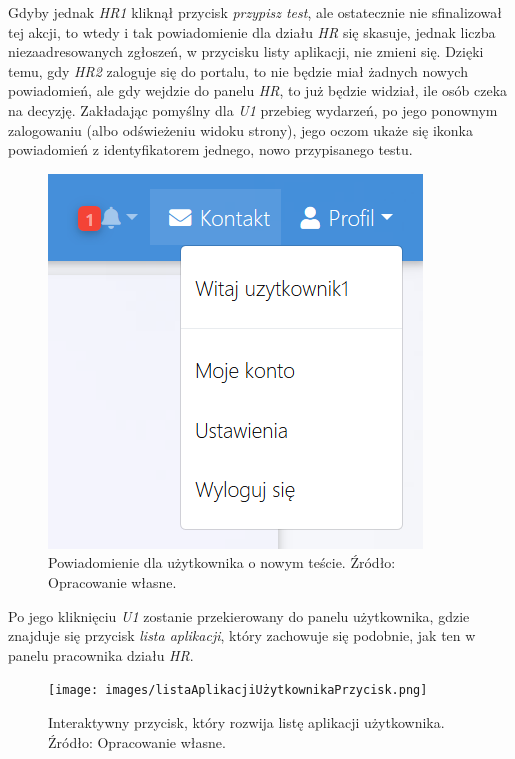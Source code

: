 \documentclass[twoside]{projektInzynierskiMS}
\numberwithin{figure}{section}
\begin{document}
Gdyby jednak \textit{HR1} kliknął przycisk \textit{przypisz test}, ale ostatecznie nie sfinalizował tej akcji, to wtedy i tak powiadomienie dla działu \textit{HR} się skasuje, jednak liczba niezaadresowanych zgłoszeń, w przycisku listy aplikacji, nie zmieni się. Dzięki temu, gdy \textit{HR2} zaloguje się do portalu, to nie będzie miał żadnych nowych powiadomień, ale gdy wejdzie do panelu \textit{HR}, to już będzie widział, ile osób czeka na decyzję. Zakładając pomyślny dla \textit{U1} przebieg wydarzeń, po jego ponownym zalogowaniu (albo odświeżeniu widoku strony), jego oczom ukaże się ikonka powiadomień z identyfikatorem jednego, nowo przypisanego testu. 

\begin{figure}[h!]
    \centering
    \includegraphics[scale = 0.7]{images/powiadomienieUzytkownika.png}
    \caption{Powiadomienie dla użytkownika o nowym teście. Źródło: Opracowanie własne.}
    \label{fig:powiadomienie_użytkownika}
\end{figure}

Po jego kliknięciu \textit{U1} zostanie przekierowany do panelu użytkownika, gdzie znajduje się przycisk \textit{lista aplikacji}, który zachowuje się podobnie, jak ten w panelu pracownika działu \textit{HR}. 

\begin{figure}[h!]
    \centering
    \texttt{[image: images/listaAplikacjiUżytkownikaPrzycisk.png]}
    \caption{Interaktywny przycisk, który rozwija listę aplikacji użytkownika. Źródło: Opracowanie własne.}
    \label{fig:lista_aplikacji_użytkownika_przycisk}
\end{figure}
\end{document}
